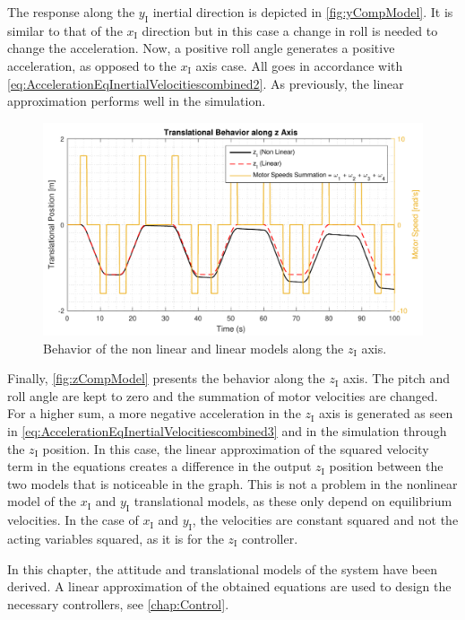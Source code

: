 \vspace{-0.8 cm}
The response along the $y_{\mathrm{I}}$ inertial direction is depicted in \autoref{fig:yCompModel}. It is similar to that of the $x_{\mathrm{I}}$ direction but in this case a change in roll is needed to change the acceleration. Now, a positive roll angle generates a positive acceleration, as opposed to the $x_{\mathrm{I}}$ axis case. All goes in accordance with \autoref{eq:AccelerationEqInertialVelocitiescombined2}. As previously, the linear approximation performs well in the simulation.
\vspace{-0.3 cm}
\begin{figure}[H]
	\centering
	\includegraphics[scale=0.62]{figures/zCompModel}
	\caption{Behavior of the non linear and linear models along the $z_{\mathrm{I}}$ axis.}
	\label{fig:zCompModel}
\end{figure}
\vspace{-0.8 cm}
Finally, \autoref{fig:zCompModel} presents the behavior along the $z_{\mathrm{I}}$ axis. The pitch and roll angle are kept to zero and the summation of motor velocities are changed. For a higher sum, a more negative acceleration in the $z_{\mathrm{I}}$ axis is generated as seen in \autoref{eq:AccelerationEqInertialVelocitiescombined3} and in the simulation through the $z_{\mathrm{I}}$ position. In this case, the linear approximation of the squared velocity term in the equations creates a difference in the output $z_{\mathrm{I}}$ position between the two models that is noticeable in the graph. 
This is not a problem in the nonlinear model of the $x_{\mathrm{I}}$ and $y_{\mathrm{I}}$ translational models, as these only depend on equilibrium velocities. In the case of $x_{\mathrm{I}}$ and $y_{\mathrm{I}}$, the velocities are constant squared and not the acting variables squared, as it is for the $z_{\mathrm{I}}$ controller.

In this chapter, the attitude and translational models of the system have been derived. A linear approximation of the obtained equations are used to design the necessary controllers, see \autoref{chap:Control}.
